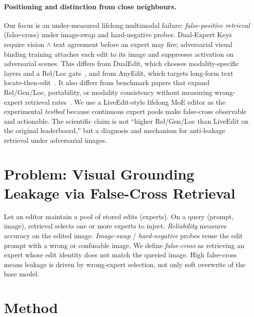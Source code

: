 \documentclass[letterpaper]{article} %
\begin{document}
\paragraph{Positioning and distinction from close neighbours.}
Our focus is an under-measured lifelong multimodal failure: \emph{false-positive retrieval} (false-cross) under image-swap and hard-negative probes.
Dual-Expert Keys require vision $\wedge$ text agreement before an expert may fire; adversarial visual binding training attaches each edit to its image and suppresses activation on adversarial scenes.
This differs from DualEdit, which chooses modality-specific layers and a Rel/Loc gate~\citep{shi2025dualedit}, and from AnyEdit, which targets long-form text locate-then-edit~\citep{jiang2025anyedit}.
It also differs from benchmark papers that expand Rel/Gen/Loc, portability, or modality consistency without measuring wrong-expert retrieval rates~\citep{huang2024vlkeb,zhang2025mcmke,du2025mmkebench,ma2025comprehendedit}.
We use a LiveEdit-style lifelong MoE editor as the experimental \emph{testbed} because continuous expert pools make false-cross observable and actionable.
The scientific claim is not ``higher Rel/Gen/Loc than LiveEdit on the original leaderboard,'' but a diagnosis and mechanism for anti-leakage retrieval under adversarial images.

\section{Problem: Visual Grounding Leakage via False-Cross Retrieval}
\label{sec:problem}

Let an editor maintain a pool of stored edits (experts).
On a query (prompt, image), retrieval selects one or more experts to inject.
\emph{Reliability} measures accuracy on the edited image.
\emph{Image-swap} / \emph{hard-negative} probes reuse the edit prompt with a wrong or confusable image.
We define \emph{false-cross} as retrieving an expert whose edit identity does not match the queried image.
High false-cross means leakage is driven by wrong-expert selection, not only soft overwrite of the base model.

\section{Method}
\label{sec:method}
\end{document}

